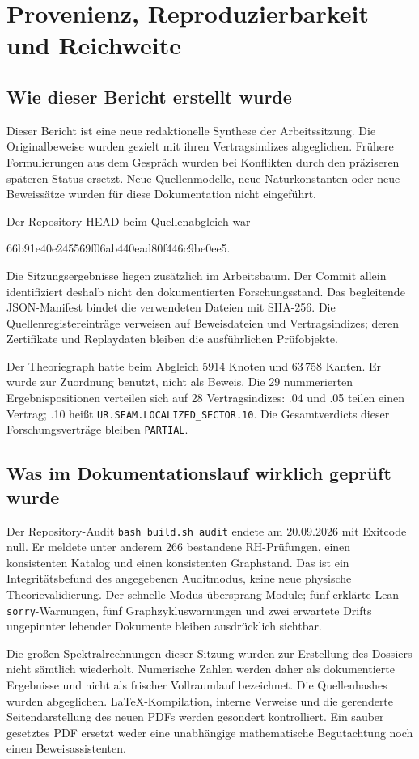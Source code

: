 \documentclass[11pt,a4paper,oneside,parskip=half,headings=normal,numbers=noenddot,bibliography=totoc]{scrreprt}
\begin{document}
\chapter{Provenienz, Reproduzierbarkeit und Reichweite}
\section{Wie dieser Bericht erstellt wurde}
Dieser Bericht ist eine neue redaktionelle Synthese der Arbeitssitzung. Die Originalbeweise wurden gezielt mit ihren Vertragsindizes abgeglichen. Frühere Formulierungen aus dem Gespräch wurden bei Konflikten durch den präziseren späteren Status ersetzt. Neue Quellenmodelle, neue Naturkonstanten oder neue Beweissätze wurden für diese Dokumentation nicht eingeführt.

Der Repository-HEAD beim Quellenabgleich war
\begin{center}\small\ttfamily 66b91e40e245569f06ab440ead80f446c9be0ee5.\end{center}
Die Sitzungsergebnisse liegen zusätzlich im Arbeitsbaum. Der Commit allein identifiziert deshalb nicht den dokumentierten Forschungsstand. Das begleitende JSON-Manifest bindet die verwendeten Dateien mit SHA-256. Die Quellenregistereinträge verweisen auf Beweisdateien und Vertragsindizes; deren Zertifikate und Replaydaten bleiben die ausführlichen Prüfobjekte.

Der Theoriegraph hatte beim Abgleich 5914 Knoten und 63\,758 Kanten. Er wurde zur Zuordnung benutzt, nicht als Beweis. Die 29 nummerierten Ergebnispositionen verteilen sich auf 28 Vertragsindizes: .04 und .05 teilen einen Vertrag; .10 heißt \texttt{UR.SEAM.LOCALIZED\_SECTOR.10}. Die Gesamtverdicts dieser Forschungsverträge bleiben \texttt{PARTIAL}.

\section{Was im Dokumentationslauf wirklich geprüft wurde}
Der Repository-Audit \texttt{bash build.sh audit} endete am 20.09.2026 mit Exitcode null. Er meldete unter anderem 266 bestandene RH-Prüfungen, einen konsistenten Katalog und einen konsistenten Graphstand. Das ist ein Integritätsbefund des angegebenen Auditmodus, keine neue physische Theorievalidierung. Der schnelle Modus übersprang Module; fünf erklärte Lean-\texttt{sorry}-Warnungen, fünf Graphzykluswarnungen und zwei erwartete Drifts ungepinnter lebender Dokumente bleiben ausdrücklich sichtbar.

Die großen Spektralrechnungen dieser Sitzung wurden zur Erstellung des Dossiers nicht sämtlich wiederholt. Numerische Zahlen werden daher als dokumentierte Ergebnisse und nicht als frischer Vollraumlauf bezeichnet. Die Quellenhashes wurden abgeglichen. LaTeX-Kompilation, interne Verweise und die gerenderte Seitendarstellung des neuen PDFs werden gesondert kontrolliert. Ein sauber gesetztes PDF ersetzt weder eine unabhängige mathematische Begutachtung noch einen Beweisassistenten.
\end{document}
